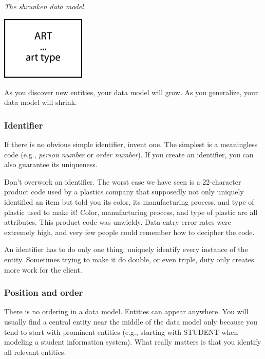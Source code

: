 \documentclass[
]{article}
\begin{document}
\emph{The shrunken data model}

\includegraphics[width=1.58333in,height=\textheight]{Figures/Chapter 7/art collection revised.png}

As you discover new entities, your data model will grow. As you
generalize, your data model will shrink.

\hypertarget{identifier-1}{%
\subsubsection*{Identifier}\label{identifier-1}}

If there is no obvious simple identifier, invent one. The simplest is a
meaningless code (e.g., \emph{person number} or \emph{order number}). If you
create an identifier, you can also guarantee its uniqueness.

Don't overwork an identifier. The worst case we have seen is a
22-character product code used by a plastics company that supposedly not
only uniquely identified an item but told you its color, its
manufacturing process, and type of plastic used to make it! Color,
manufacturing process, and type of plastic are all attributes. This
product code was unwieldy. Data entry error rates were extremely high,
and very few people could remember how to decipher the code.

An identifier has to do only one thing: uniquely identify every instance
of the entity. Sometimes trying to make it do double, or even triple,
duty only creates more work for the client.

\hypertarget{position-and-order}{%
\subsubsection*{Position and order}\label{position-and-order}}

There is no ordering in a data model. Entities can appear anywhere. You
will usually find a central entity near the middle of the data model
only because you tend to start with prominent entities (e.g., starting
with STUDENT when modeling a student information system). What really
matters is that you identify all relevant entities.
\end{document}
